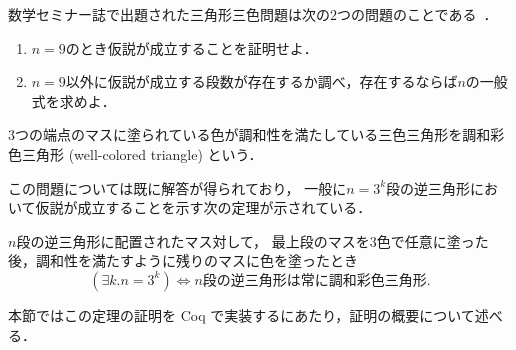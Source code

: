 数学セミナー誌で出題された三角形三色問題は次の$2$つの問題のことである~\cite{Nishiyama2}．
\begin{enumerate}
\item \label{que:1}
  $n=9$のとき仮説が成立することを証明せよ．
\item \label{que:2}
  $n=9$以外に仮説が成立する段数が存在するか調べ，存在するならば$n$の一般式を求めよ．
\end{enumerate}
\begin{dfn}[調和彩色三角形] \label{dfn:wc_tri}
  $3$つの端点のマスに塗られている色が調和性を満たしている三色三角形を調和彩色三角形 (well-colored triangle) という．
\end{dfn}

この問題については既に解答が得られており，
一般に$n=3^k$段の逆三角形において仮説が成立することを示す次の定理が示されている．
\begin{thm} \label{thm:tri_iff}
  $n$段の逆三角形に配置されたマス対して，
  最上段のマスを$3$色で任意に塗った後，調和性を満たすように残りのマスに色を塗ったとき
  \[
  (\exists k.n=3^k) \Leftrightarrow \text{$n$段の逆三角形は常に調和彩色三角形}.
  \]
\end{thm}

本節ではこの定理の証明を Coq で実装するにあたり，証明の概要について述べる．

